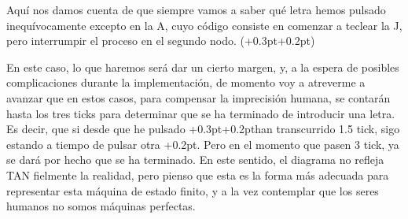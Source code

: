 \documentclass[a4paper,openright,12pt]{article}
\newcommand{\punto}{\kern+0.3pt\raisebox{0.35ex}{\huge\textbf.}}
\newcommand{\raya}{\kern+0.2pt\raisebox{-0.35ex}{\huge\textbf-}}
\begin{document}
\begin{center}
\end{center}

\bigskip
Aquí nos damos cuenta de que siempre vamos a saber qué letra hemos pulsado inequívocamente excepto en la A, cuyo código consiste en comenzar a teclear la J, pero interrumpir
el proceso en el segundo nodo. (\punto\raya)

En este caso, lo que haremos será dar un cierto margen, y, a la espera de posibles complicaciones durante la implementación, de momento voy a atreverme a avanzar que en
estos casos, para compensar la imprecisión humana, se contarán hasta los tres ticks para determinar que se ha terminado de introducir una letra.
Es decir, que si desde que he pulsado \punto\raya \space han transcurrido 1.5 tick, sigo estando a tiempo de pulsar otra \raya. Pero en el momento que pasen 3 tick,
ya se dará por hecho que se ha terminado. En este sentido, el diagrama no refleja TAN fielmente la realidad, pero pienso que esta es la forma más adecuada para representar
esta máquina de estado finito, y a la vez contemplar que los seres humanos no somos máquinas perfectas.
\end{document}
